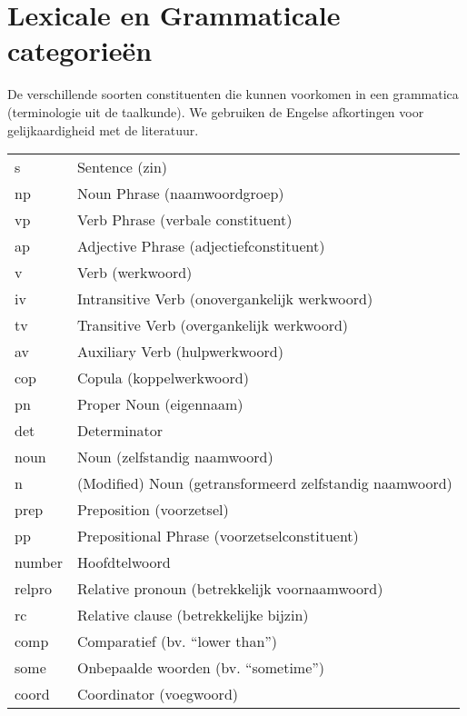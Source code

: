 \section*{Lexicale en Grammaticale categorieën}
De verschillende soorten constituenten die kunnen voorkomen in een grammatica (terminologie uit de taalkunde). We gebruiken de Engelse afkortingen voor gelijkaardigheid met de literatuur.
\begin{flushleft}
  \renewcommand{\arraystretch}{1.1}
  \begin{tabularx}{\textwidth}{@{}p{12mm}X@{}}
    s     & Sentence (zin) \\
    np    & Noun Phrase (naamwoordgroep) \\
    vp    & Verb Phrase (verbale constituent) \\
    ap    & Adjective Phrase (adjectiefconstituent) \\
    v     & Verb (werkwoord) \\
    iv    & Intransitive Verb (onovergankelijk werkwoord) \\
    tv    & Transitive Verb (overgankelijk werkwoord) \\
    av    & Auxiliary Verb (hulpwerkwoord) \\
    cop   & Copula (koppelwerkwoord) \\
    pn    & Proper Noun (eigennaam) \\
    det   & Determinator \\
    noun  & Noun (zelfstandig naamwoord) \\
    n     & (Modified) Noun (getransformeerd zelfstandig naamwoord) \\
    prep  & Preposition (voorzetsel) \\
    pp    & Prepositional Phrase (voorzetselconstituent) \\
    number& Hoofdtelwoord \\
    relpro& Relative pronoun (betrekkelijk voornaamwoord) \\
    rc    & Relative clause (betrekkelijke bijzin) \\
    comp  & Comparatief (bv. ``lower than'') \\
    some  & Onbepaalde woorden (bv. ``sometime'') \\
    coord & Coordinator (voegwoord) \\
  \end{tabularx}
\end{flushleft}

